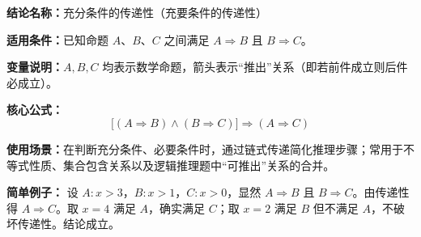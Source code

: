 \textbf{结论名称：}充分条件的传递性（充要条件的传递性）

\textbf{适用条件：}已知命题 \(A\)、\(B\)、\(C\) 之间满足 \(A \Rightarrow B\) 且 \(B \Rightarrow C\)。

\textbf{变量说明：}\(A, B, C\) 均表示数学命题，箭头表示“推出”关系（即若前件成立则后件必成立）。

\textbf{核心公式：}
\[
\boxed{\bigl[(A \Rightarrow B) \land (B \Rightarrow C)\bigr] \Longrightarrow (A \Rightarrow C)}
\]

\textbf{使用场景：}在判断充分条件、必要条件时，通过链式传递简化推理步骤；常用于不等式性质、集合包含关系以及逻辑推理题中“可推出”关系的合并。

\textbf{简单例子：}
设 \(A: x>3\)，\(B: x>1\)，\(C: x>0\)，显然 \(A \Rightarrow B\) 且 \(B \Rightarrow C\)。由传递性得 \(A \Rightarrow C\)。取 \(x=4\) 满足 \(A\)，确实满足 \(C\)；取 \(x=2\) 满足 \(B\) 但不满足 \(A\)，不破坏传递性。结论成立。
